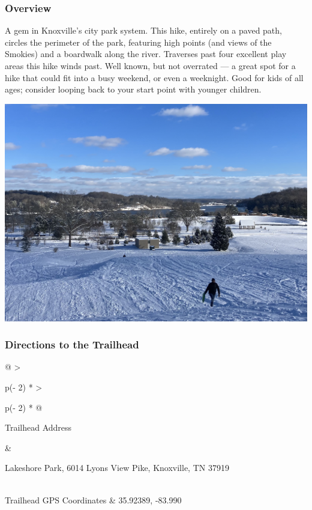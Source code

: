 \documentclass[
  letterpaper,
  DIV=11,
  numbers=noendperiod]{scrartcl}
\begin{document}
\hypertarget{overview-2}{%
\subsubsection{Overview}\label{overview-2}}

A gem in Knoxville's city park system. This hike, entirely on a paved
path, circles the perimeter of the park, featuring high points (and
views of the Smokies) and a boardwalk along the river. Traverses past
four excellent play areas this hike winds past. Well known, but not
overrated --- a great spot for a hike that could fit into a busy
weekend, or even a weeknight. Good for kids of all ages; consider
looping back to your start point with younger children.

\includegraphics{img/trail-03-figure-01.jpg}

\hypertarget{directions-to-the-trailhead-2}{%
\subsubsection{Directions to the
Trailhead}\label{directions-to-the-trailhead-2}}

\begin{longtable}[]{@{}
  >{\raggedright\arraybackslash}p{(\columnwidth - 2\tabcolsep) * }
  >{\raggedright\arraybackslash}p{(\columnwidth - 2\tabcolsep) * }@{}}
\toprule\noalign{}
\begin{minipage}[b]{\linewidth}\raggedright
Trailhead Address
\end{minipage} & \begin{minipage}[b]{\linewidth}\raggedright
Lakeshore Park, 6014 Lyons View Pike, Knoxville, TN 37919
\end{minipage} \\
\midrule\noalign{}
\endhead
\bottomrule\noalign{}
\endlastfoot
Trailhead GPS Coordinates & 35.92389, -83.990 \\
\end{longtable}
\end{document}

